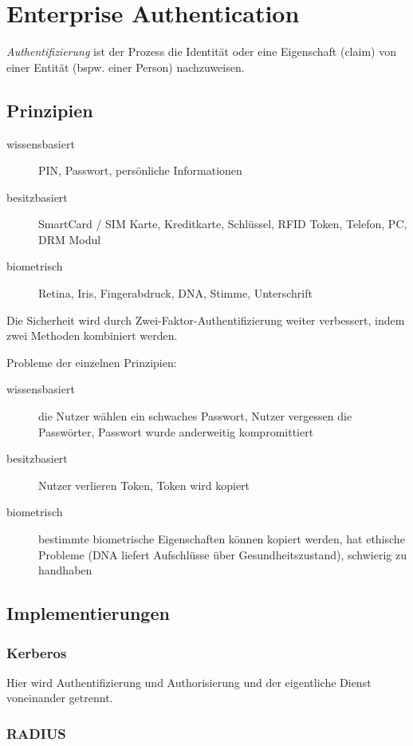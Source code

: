 \section{Enterprise Authentication}%
\label{sec:enterprise_authentication}

\begin{definition}
  \emph{Authentifizierung} ist der Prozess die Identität oder eine Eigenschaft (claim)
  von einer Entität (bspw. einer Person) nachzuweisen.
\end{definition}

\subsection{Prinzipien}%
\label{sub:prinzipien}

\begin{description}
  \item[wissensbasiert] PIN, Passwort, persönliche Informationen
  \item[besitzbasiert] SmartCard / SIM Karte, Kreditkarte, Schlüssel, RFID Token, Telefon,
    PC, DRM Modul
  \item[biometrisch] Retina, Iris, Fingerabdruck, DNA, Stimme, Unterschrift
\end{description}
Die Sicherheit wird durch Zwei-Faktor-Authentifizierung weiter verbessert, indem zwei
Methoden kombiniert werden.

Probleme der einzelnen Prinzipien:
\begin{description}
  \item[wissensbasiert] die Nutzer wählen ein schwaches Passwort,
    Nutzer vergessen die Passwörter, Passwort wurde anderweitig kompromittiert
  \item[besitzbasiert] Nutzer verlieren Token, Token wird kopiert
  \item[biometrisch] bestimmte biometrische Eigenschaften können kopiert werden,
    hat ethische Probleme (DNA liefert Aufschlüsse über Gesundheitszustand),
    schwierig zu handhaben
\end{description}

\subsection{Implementierungen}%
\label{sub:implementierungen}

\subsubsection{Kerberos}

Hier wird Authentifizierung und Authorisierung und der eigentliche Dienst voneinander
getrennt.


\subsubsection{RADIUS}
